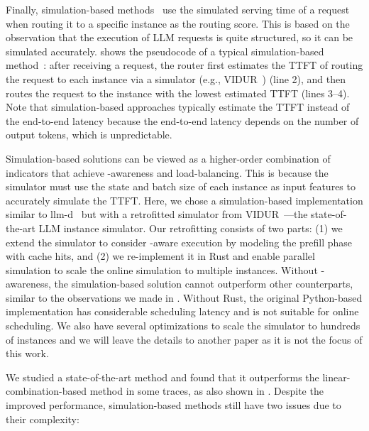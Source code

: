 Finally, simulation-based methods~\cite{305212, llm-d, DBLP:journals/corr/abs-2507-17769, DBLP:journals/corr/abs-2504-08784}
use the simulated serving time of a request when routing it to a specific instance as the routing score.
This is based on the observation that the execution of LLM requests is quite structured,
so it can be simulated accurately.
{} shows the pseudocode of a typical simulation-based method~\cite{llm-d}:
after receiving a request,
the router first estimates the TTFT of routing the request to each instance via a simulator (e.g., VIDUR~\cite{DBLP:conf/mlsys/AgrawalKMPKGRT24}) (line 2),
and then routes the request to the instance with the lowest estimated TTFT (lines 3--4).
Note that simulation-based approaches typically estimate the TTFT instead of the end-to-end latency
because the end-to-end latency depends on the number of output tokens, which is unpredictable.


Simulation-based solutions can be viewed as a higher-order combination
of indicators that achieve {\kvcache}-awareness and load-balancing.
This is because the simulator must use the {\kvcache} state and batch size of each instance
as input features to accurately simulate the TTFT.
Here, we chose a simulation-based implementation 
similar to llm-d~\cite{llm-d}
 but with a retrofitted simulator from VIDUR~\cite{DBLP:conf/mlsys/AgrawalKMPKGRT24}---the 
state-of-the-art LLM instance simulator. 
Our retrofitting consists of two parts:
(1) we extend the simulator to consider {\kvcache}-aware execution by modeling the prefill phase with cache hits,
and (2) we re-implement it in Rust and enable parallel simulation to scale the online simulation to multiple instances. 
Without {\kvcache}-awareness, the simulation-based solution cannot outperform other counterparts,
similar to the observations we made in \textsection{\ref{sec:kvcache-aware}}.
Without Rust, the original Python-based implementation has considerable scheduling latency
and is not suitable for online scheduling.
We also have several optimizations to scale the simulator to hundreds of instances 
and we will leave the details to another paper as it is not the focus of this work. 

We studied a state-of-the-art method and found that it
outperforms the linear-combination-based method in some traces,
as also shown in {}.
Despite the improved performance, simulation-based methods still have two issues due to their complexity:

